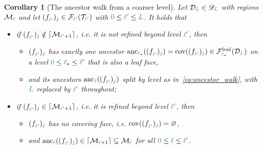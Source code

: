 \documentclass[a4paper, 12pt]{article}
\makeatletter
\newcommand{\lstar}{\l_{\ast}}
\newcommand{\green}{\color{ForestGreen}}
\newcommand{\brickred}{\color{BrickRed}}
\newcommand{\T}{\mathcal{T}}
\newcommand{\F}{\mathcal{F}}
\newcommand{\face}[2]{\freeQ{f}{}{#1}{#2}}
\newcommand{\fineIdxone}{{\brickred j}}
\renewcommand{\l}{{\green\ell}}
\renewcommand{\L}{{\green L}}
\newcommand{\lzero}{{\green 0}}
\newcommand{\lone}{{\green {\l'}  }}
\newcommand{\freeQ}[4]{ ( {#1}^{#2}_{#3} )_{#4}}
\newcommand{\M}{\mathcal{M}}
\newtheorem{corollary}[theorem]{Corollary}
\theoremstyle{definition}
\theoremstyle{plain}
\numberwithin{equation}{section}
\newcommand{\ancestorPatch}[1]{\lceil #1 \rceil}
\DeclareRobustCommand{\domseq}[1][]{\mathcal{D}\ifx\@empty#1\@empty\else_{#1}\fi}
\newcommand{\alldomseqs}{\mathscr{D}}
\newcommand{\leafF}[1]{\F^{\mathrm{leaf}}_{#1}}             %
\newcommand{\anc}[1]{\mathrm{anc}_{#1}}                     %
\newcommand{\coveringFace}{\mathrm{cov}}                    %
\makeatother
\begin{document}
\begin{corollary}[The ancestor walk from a coarser level]
    \label{cor:ancestor_walk}
    Let $\domseq[\L] \in \alldomseqs_\L$ with regions $\M_\l$ and let $\face{\lone}{\fineIdxone} \in \F_\lone(\T_\lone)$ with $\lzero \leq \lone \leq \L$. It holds that
    \begin{itemize}
        \item if $\face{\lone}{\fineIdxone} \notin \ancestorPatch{\M_{\lone+1}}$, i.e. it is not refined beyond level $\lone$, then
        \begin{itemize}
            \item[$(i)$] $\face{\lone}{\fineIdxone}$ has exactly one ancestor $\anc{\lstar}(\face{\lone}{\fineIdxone}) = \coveringFace(\face{\lone}{\fineIdxone}) \in \leafF{\lstar}(\domseq[\L])$ on a level $\lzero \leq \lstar \leq \lone$ that is also a leaf face,
            \item[$(ii)$] and its ancestors $\anc{\l}(\face{\lone}{\fineIdxone})$ split by level as in~\eqref{eq:ancestor_walk}, with $\L$ replaced by $\lone$ throughout;
        \end{itemize}
        \item if $\face{\lone}{\fineIdxone} \in \ancestorPatch{\M_{\lone+1}}$, i.e. it is refined beyond level $\lone$, then
        \begin{itemize}
            \item[$(i')$] $\face{\lone}{\fineIdxone}$ has no covering face, i.e. $\coveringFace(\face{\lone}{\fineIdxone}) = \varnothing$,
            \item[$(ii')$] and $\anc{\l}(\face{\lone}{\fineIdxone}) \in \ancestorPatch{\M_{\l+1}} \subseteq \M_\l$ for all $\lzero \leq \l \leq \lone$.
        \end{itemize}
    \end{itemize}
\end{corollary}
\end{document}
